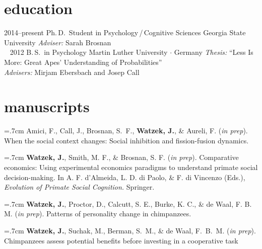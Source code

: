 \documentclass[]{friggeri-cv}
\begin{document}
\section{education}

\begin{entrylist}
  \entry
    {2014--present}
    {Ph.\,D.~Student in Psychology\,/\,Cognitive Sciences}
    {Georgia State University}
    {\emph{Adviser:} Sarah Brosnan\\~}
  \entry
    {2012}
    {B.\,S.~in Psychology}
    {Martin Luther University $\cdot$ Germany}
    {\emph{Thesis:} ``Less Is More: Great Apes' Understanding of Probabilities''\\
    \emph{Advisers:} Mirjam Ebersbach and Josep Call}
\end{entrylist}

%

\section{manuscripts}

\hangindent=.7cm Amici, F., Call, J., Brosnan, S.~F., \textbf{Watzek, J.}, \& Aureli, F. (\emph{in prep}). When the social context changes: Social inhibition and fission-fusion dynamics.

\hangindent=.7cm \textbf{Watzek, J.}, Smith, M. F., \& Brosnan, S. F. (\emph{in prep}). Comparative economics: Using experimental economics paradigms to understand primate social decision-making. In A. F. d'Almeida, L. D. di Paolo, \& F. di Vincenzo (Eds.), \emph{Evolution of Primate Social Cognition.} Springer.

\hangindent=.7cm \textbf{Watzek, J.}, Proctor, D., Calcutt, S. E., Burke, K. C., \& de Waal, F. B. M. (\emph{in prep}). Patterns of personality change in chimpanzees.

\hangindent=.7cm \textbf{Watzek, J.}, Suchak, M., Berman, S.~M., \& de Waal, F.~B.~M. (\emph{in prep}). Chimpanzees assess potential benefits before investing in a cooperative task\\[-.1cm]
\end{document}
